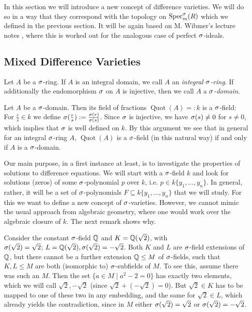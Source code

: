 In this section we will introduce a new concept of difference varieties. We will do so in a way that they correspond with the topology on $\operatorname{Spec}^\sigma_m(R)$ which we defined in the previous section. It will be again based on M. Wibmer's lecture notes \cite{wibmer}, 
where this is worked out for the analogous case of perfect $\sigma$-ideals.

\subsection{Mixed Difference Varieties}


\begin{defn}
Let $A$ be a $\sigma$-ring. If $A$ is an integral domain, we call $A$ an \emph{integral $\sigma$-ring}. If additionally the endomorphism $\sigma$ on $A$ is injective, then we call $A$ a \emph{$\sigma$-domain}.  
\end{defn}

\begin{rem}\label{sdomain=field}
Let $A$ be a $\sigma$-domain. Then its field of fractions $\operatorname{Quot}(A) =: k$ is a $\sigma$-field: For $\frac{r}{s} \in k$ we define $\sigma(\frac{r}{s}):= \frac{\sigma(r)}{\sigma(s)}$. Since $\sigma$ is injective, we have $\sigma(s) \neq 0$ for $s \neq 0$, which implies that $\sigma$ is well defined on $k$.
By this argument we see that in general for an integral $\sigma$-ring $A$, $\operatorname{Quot}(A)$ is a $\sigma$-field (in this natural way) if and only if $A$ is a $\sigma$-domain.
\end{rem}

Our main purpose, in a first instance at least, is to investigate the properties of solutions to difference equations. 
We will start with a $\sigma$-field $k$ and look for solutions (zeros) of some $\sigma$-polynomial $p$ over $k$, i.e. $p \in k\{y_1, \ldots, y_n \}$. In general, rather, it will be a set of $\sigma$-polynomials $F \subseteq k\{y_1, \ldots, y_n \}$ that we will study. 
For this we want to define a new concept of $\sigma$-varieties. However, we cannot mimic the usual approach from algebraic geometry, where one would work over the algebraic closure of $k$. The next remark shows why.

\begin{rem}\label{incompatibleextensions}
 Consider the constant $\sigma$-field $\mathbb{Q}$ and $K = \mathbb{Q}(\sqrt{2})$, with \\ $\sigma (\sqrt{2}) = \sqrt{2}$; $L = \mathbb{Q}(\sqrt{2}), \sigma(\sqrt{2}) = - \sqrt{2}$. 
Both $K$ and $L$ are $\sigma$-field extensions of $\mathbb{Q}$, but there cannot be a further extension $\mathbb{Q} \leq M$ of $\sigma$-fields, such that $K,L \leq M$ are both (isomorphic to) $\sigma$-subfields of $M$. 
To see this, assume there was such an $M$. Then the set $\{ a \in M \mid a^2 - 2 = 0 \}$ has exactly two elements, which we will call $\sqrt{2}, -\sqrt{2}$ (since $\sqrt{2} + (- \sqrt{2}) = 0$).
But $\sqrt{2} \in K$ has to be mapped to one of these two in any embedding, and the same for $\sqrt{2} \in L$, which already yields the contradiction,
 since in $M$ either $\sigma(\sqrt{2}) = \sqrt{2}$ or $\sigma(\sqrt{2}) = -\sqrt{2}$.
\end{rem}

